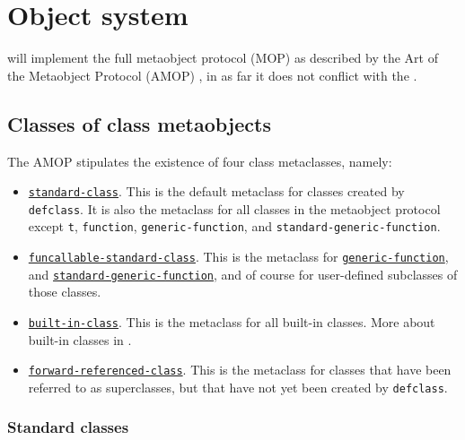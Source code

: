 \chapter{Object system}

\sysname{} will implement the full metaobject protocol (MOP) as
described by the Art of the Metaobject Protocol (AMOP)
\cite{Kiczales:1991:AMP:574212}, in as far it does not conflict with
the \hs{}.

\section{Classes of class metaobjects}

The AMOP stipulates the existence of four class metaclasses, namely:

\begin{itemize}
\item \href{http://www.metamodular.com/CLOS-MOP/class-standard-class.html}
  {\texttt{standard-class}}.
  This is the default metaclass for classes
  created by \texttt{defclass}.  It is also the metaclass for all
  classes in the metaobject protocol except \texttt{t},
  \texttt{function}, \texttt{generic-function}, and
  \texttt{standard-generic-function}. 
\item \href{http://www.metamodular.com/CLOS-MOP/class-funcallable-standard-class.html}
{\texttt{funcallable-standard-class}}.
This is the metaclass for
\href{http://www.metamodular.com/CLOS-MOP/class-generic-function.html}
{\texttt{generic-function}}, 
and 
\href{http://www.metamodular.com/CLOS-MOP/class-standard-generic-function.html}
{\texttt{standard-generic-function}},
and of course for user-defined subclasses of those classes. 
\item \href{http://www.metamodular.com/CLOS-MOP/class-built-in-class.html}
{\texttt{built-in-class}}.  
This is the metaclass for all built-in
classes.  More about built-in classes in
. 
\item \href{http://www.metamodular.com/CLOS-MOP/class-forward-referenced-class.html}
{\texttt{forward-referenced-class}}.  This is the metaclass for
  classes that have been referred to as superclasses, but that have
  not yet been created by \texttt{defclass}.
\end{itemize}

\subsection{Standard classes}
\label{object-system-standard-classes}

